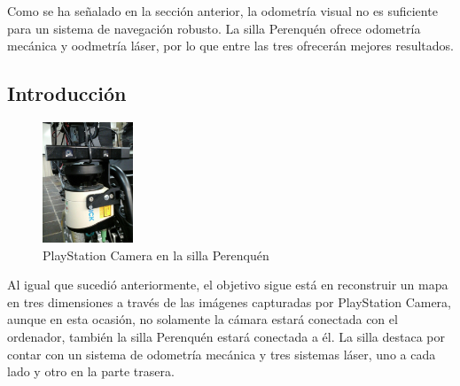 

Como se ha señalado en la sección anterior, la odometría visual no es suficiente
para un sistema de navegación robusto. La silla Perenquén ofrece odometría
mecánica y oodmetría láser, por lo que entre las tres ofrecerán mejores
resultados.

\subsection{Introducción}

\begin{figure}
  \vspace{-20pt}
  \begin{center}
    \includegraphics[width=0.24\textwidth]{images/cap4/Perenquen-camara.eps}
  \end{center}
  \vspace{-20pt}
  \caption{PlayStation Camera en la silla Perenquén}
  \vspace{-10pt}
  \label{fig:Perenquen-Camara}
\end{figure}

Al igual que sucedió anteriormente, el objetivo sigue está en reconstruir un
mapa en tres dimensiones a través de las imágenes capturadas por PlayStation
Camera, aunque en esta ocasión, no solamente la cámara estará conectada con el
ordenador, también la silla Perenquén estará conectada a él. La silla destaca
por contar con un sistema de odometría mecánica y tres sistemas láser, uno a
cada lado y otro en la parte trasera.

